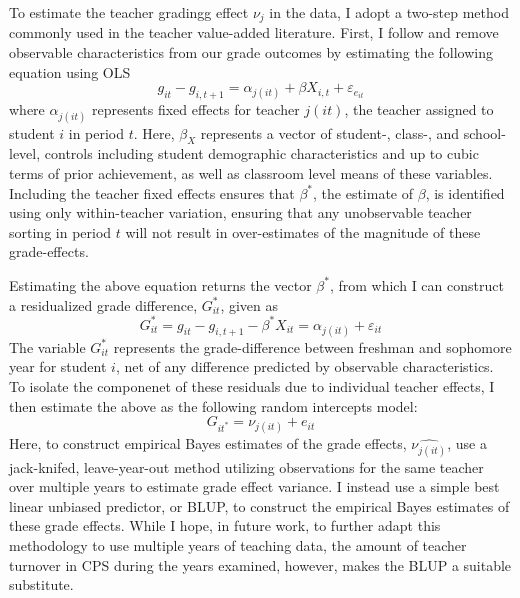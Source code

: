 \documentclass[../thesis_main.tex]{subfiles}
\begin{document}
To estimate the teacher gradingg effect $\nu_j$ in the data, I  adopt a two-step method commonly used in the teacher value-added literature. First, I  follow \citet{chettyMeasuringImpactsTeachers2014} and remove observable characteristics from our grade outcomes by estimating the following equation using OLS
\begin{equation}
	g_{it}-g_{i,t+1} = \alpha_{j(it)} + \beta X_{i,t} + \varepsilon_{e_{it}}
	\label{eqn:ge_eqn}
\end{equation}
where $\alpha_{j(it)}$ represents fixed effects for teacher $j(it)$, the teacher assigned to student $i$ in period $t$. Here, $\beta_{X}$ represents a vector of student-, class-, and school-level, controls including student demographic characteristics and up to cubic terms of prior achievement, as well as classroom level means of these variables. Including the teacher fixed effects ensures that $\beta^*$, the estimate of $\beta$, is identified using only within-teacher variation, ensuring that any unobservable teacher sorting in period $t$ will not result in over-estimates of the magnitude of these grade-effects. 

Estimating the above equation returns the vector $\beta^*$, from which I  can construct a residualized grade difference, $G_{it}^*$, given as
\begin{equation}
	G_{it}^* = g_{it}-g_{i,t+1}-\beta^* X_{it}  = \alpha_{j(it)} + \varepsilon_{it}
\end{equation}
The variable $G_{it}^*$ represents the grade-difference between freshman and sophomore year for student $i$, net of any difference predicted by observable characteristics. To isolate the componenet of these residuals due to individual teacher effects, I then estimate the above as the following random intercepts model:
\begin{equation*}
	\label{eqn:re_eqn}
	G_{it^{*}} = \nu_{j(it)} +{e_{it}}
\end{equation*} 
Here, to construct empirical Bayes estimates of the grade effects, $\hat{\nu_{j(it)}}$, \citet{chettyMeasuringImpactsTeachers2014} use a jack-knifed, leave-year-out method utilizing observations for the same teacher over multiple years to estimate grade effect variance. I instead use a simple best linear unbiased predictor, or BLUP, to construct the empirical Bayes estimates of these grade effects. While I hope, in future work, to further adapt this methodology to use multiple years of teaching data, the amount of teacher turnover in CPS during the years examined, however, makes the BLUP a suitable substitute. 
\end{document}

